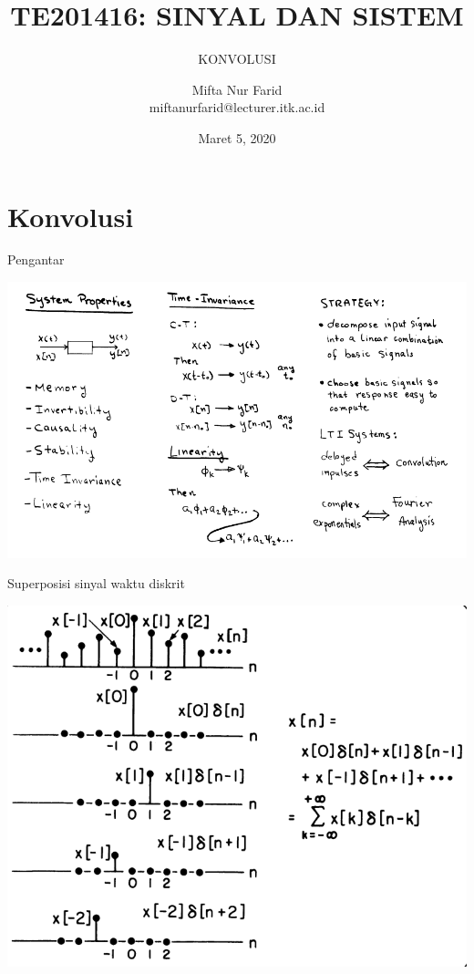 \documentclass[aspectratio=169]{beamer}
\author{Mifta Nur Farid \\
	miftanurfarid@lecturer.itk.ac.id}
\title{TE201416: SINYAL DAN SISTEM}
\subtitle{KONVOLUSI}
\institute{Teknik Elektro \\ Institut Teknologi Kalimantan \\ Balikpapan, Indonesia}
\date{\tiny Maret 5, 2020}
\begin{document}
\begin{frame}[t,plain]
\titlepage
\end{frame}


\section{Konvolusi}

\begin{frame}{Pengantar}
	\begin{center}
		\includegraphics[width=0.8\linewidth]{gambar/03.konvolusi/mk.4.01}
	\end{center}
\end{frame}

\begin{frame}{Superposisi sinyal waktu diskrit}
	\begin{center}
		\includegraphics[height=0.8\textheight]{gambar/03.konvolusi/fig.4.01}
	\end{center}
\end{frame}
\end{document}
